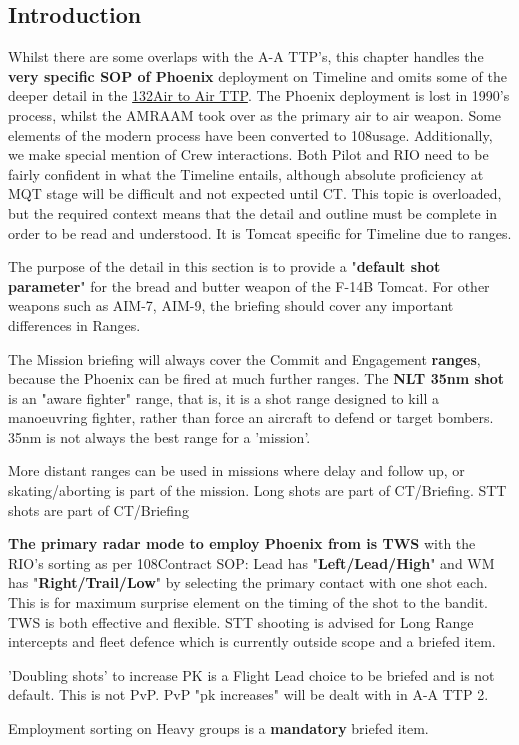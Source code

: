 \subsection{Introduction}

Whilst there are some overlaps with the A-A TTP's, this chapter handles the
\textbf{very specific SOP of Phoenix} deployment on Timeline and omits some of
the deeper detail in the
\href{https://cloud.132virtualwing.org/s/DdLFQX4LLTExij2}{132\nd Air to Air
TTP}. The Phoenix deployment is lost in
1990's process, whilst the AMRAAM took over as the primary air to air weapon.
Some elements of the modern process have been converted to 108\th usage.
Additionally, we make special mention of Crew interactions. Both Pilot and RIO
need to be fairly confident in what the Timeline entails, although absolute
proficiency at MQT stage will be difficult and not expected until CT. This
topic is overloaded, but the required context means that the detail and outline
must be complete in order to be read and understood. It is Tomcat specific for
Timeline due to ranges.

The purpose of the detail in this section is to provide a "\textbf{default shot
parameter}" for the bread and butter weapon of the F-14B Tomcat. For other
weapons such as AIM-7, AIM-9, the briefing should cover any important
differences in Ranges.

The Mission briefing will always cover the Commit and Engagement
\textbf{ranges}, because the Phoenix can be fired at much further ranges. The
\textbf{NLT 35nm shot} is an "aware fighter" range, that is, it is a shot range
designed to kill a manoeuvring fighter, rather than force an aircraft to defend
or target bombers. 35nm is not always the best range for a 'mission'.

More distant ranges can be used in missions where delay and follow up, or
skating/aborting is part of the mission. Long shots are part of CT/Briefing. STT
shots are part of CT/Briefing

\textbf{The primary radar mode to employ Phoenix from is TWS} with the RIO's
sorting as per 108\th Contract SOP: Lead has "\textbf{Left/Lead/High}" and WM
has "\textbf{Right/Trail/Low}" by selecting the primary contact with one shot
each. This is for maximum surprise element on the timing of the shot to the
bandit. TWS is both effective and flexible. STT shooting is advised for Long
Range intercepts and fleet defence which is currently outside scope and a
briefed item.

'Doubling shots' to increase PK is a Flight Lead choice to be briefed and is
not default. This is not PvP. PvP "pk increases" will be dealt with in A-A TTP
2.

Employment sorting on Heavy groups is a \textbf{mandatory} briefed item.
